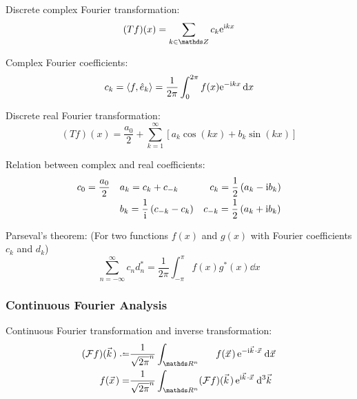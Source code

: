 			\noindent
			Discrete complex Fourier transformation:
			\begin{equation}
				(Tf)(x)=\sum_{k\in\integers}c_k \ex^{\i kx}
			\end{equation}

			\noindent
			Complex Fourier coefficients:
			\begin{equation}
				c_k = \left<f,\hat{e}_k\right>=\frac{1}{2\pi}\int_0^{2\pi}f(x)\mathrm{e}^{-\mathrm{i} kx}\dd{x}
			\end{equation}

			\noindent
			Discrete real Fourier transformation:
			\begin{equation}
				(Tf)(x)=\frac{a_0}{2}+\sum_{k=1}^{\infty}\left[a_k \cos(kx) + b_k \sin(kx) \right]
			\end{equation}

			\noindent
			Relation between complex and real coefficients:
			\begin{equation}
				\begin{array}{clc}
					c_0 = \dfrac{a_0}{2} & a_k = c_k+c_{-k} & \phantom{_{-}}c_k = \dfrac{1}{2}\left(a_k-\i b_k\right) \\ [6pt]
					& b_k = \dfrac{1}{\i}\left(c_{-k}-c_{k}\right) & c_{-k} = \dfrac{1}{2}\left(a_k+\i b_k\right)
				\end{array}
			\end{equation}

			\noindent
			Parseval's theorem: (For two functions $f(x)$ and $g(x)$ with Fourier coefficients $c_k$ and $d_k$)
			\begin{equation}
				\sum_{n=-\infty}^{\infty} c_n d_n^* = \frac{1}{2\pi}\int_{-\pi}^{\pi} f(x)g^*(x)\dd{x}
			\end{equation}

		\subsubsection{Continuous Fourier Analysis}
			\noindent
			Continuous Fourier transformation and inverse transformation:
			\begin{equation}
				\begin{aligned}
					(\mathcal{F}f)(\vec{k}) \defeq & \frac{1}{\sqrt{2\pi}^n}\int_{\reals ^n} \phantom{(\mathcal{F})}f(\vec{x})\, \ex^{-\i\vec{k}\cdot\vec{x}}\dd{\vec{x}} \\
					\phantom{(\mathcal{F})}f(\vec{x}) =& \frac{1}{\sqrt{2\pi}^n}\int_{\reals ^n} (\mathcal{F}f)(\vec{k}) \,\ex^{\i\vec{k}\cdot\vec{x}}\dd[3]{\vec{k}} \\
				\end{aligned}
			\end{equation}

